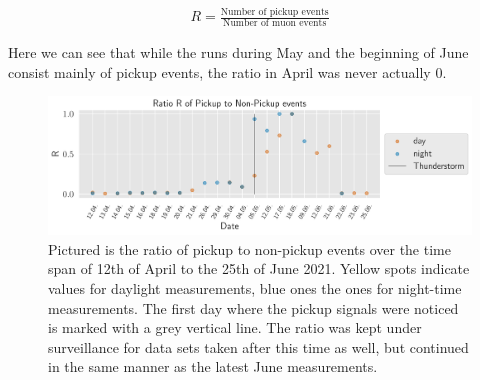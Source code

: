     \begin{align}
        R = \frac{\text{Number of pickup events}}{\text{Number of muon events}}
    \end{align}
    
    Here we can see that while the runs during May and the beginning of June consist mainly of pickup events, the ratio in April was never actually 0. 
    
    \begin{figure}
        \centering
        \includegraphics[width=\textwidth]{pictures/pickup-timeline.pdf}
        \caption{Pictured is the ratio of pickup to non-pickup events over the time span of 12th of April to the 25th of June 2021. Yellow spots indicate values for daylight measurements, blue ones the ones for night-time measurements. The first day where the pickup signals were noticed is marked with a grey vertical line. The ratio was kept under surveillance for data sets taken after this time as well, but continued in the same manner as the latest June measurements.}
        \label{fig:pickup-timeline}
    \end{figure}
    
    
